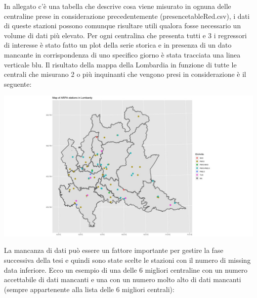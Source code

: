 \documentclass{article}
\begin{document}
In allegato c'è una tabella che descrive cosa viene misurato in ognuna
delle centraline prese in considerazione precedentemente (presencetableRed.csv), i dati di queste stazioni possono comunque risultare utili qualora fosse necessario un volume di dati più elevato.
Per ogni centralina che presenta tutti e 3 i regressori di interesse è stato fatto
un plot della serie storica e in presenza di un dato mancante in corrispondenza
di uno specifico giorno è stata tracciata una linea verticale blu.
Il risultato della mappa della Lombardia in funzione di tutte le centrali che misurano 2 o più inquinanti che 
vengono presi in considerazione è il seguente:

\includegraphics[scale=0.35]{mappina.jpeg}

La mancanza di dati può essere un fattore importante per gestire la fase successiva della tesi
e quindi sono state scelte le stazioni con il numero di missing data inferiore.
Ecco un esempio di una  delle 6 migliori centraline con un numero accettabile di dati mancanti e una con
un numero molto alto di dati mancanti (sempre appartenente alla lista delle 6 migliori centrali):
\end{document}
